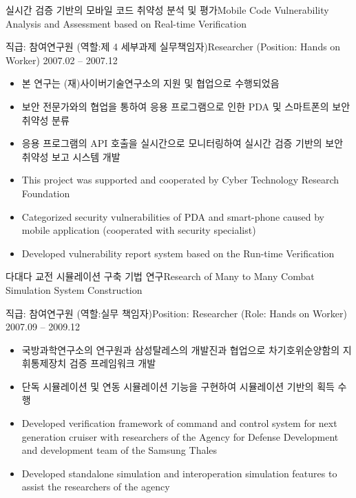 \documentclass[english,full]{resume_structure}
\begin{document}
\begin{Project}
  
{실시간 검증 기반의 모바일 코드 취약성 분석 및 평가}{Mobile Code Vulnerability Analysis and Assessment based on Real-time Verification}
{}{} 
{
\ResumeSubSection %
    {직급: 참여연구원 (역할:제 4 세부과제 실무책임자)}{Researcher (Position: Hands on Worker)}
    {2007.02 -- 2007.12}
    {
      \begin{itemize}
        \item 본 연구는 (재)사이버기술연구소의 지원 및 협업으로 수행되었음
        \item 보안 전문가와의 협업을 통하여 응용 프로그램으로 인한 PDA 및 스마트폰의 보안 취약성 분류
        \item 응용 프로그램의 API 호출을 실시간으로 모니터링하여 실시간 검증 기반의 보안 취약성 보고 시스템 개발
      \end{itemize}
    }
    {
      \begin{itemize}
        \item This project was supported and cooperated by Cyber Technology Research Foundation
        \item Categorized security vulnerabilities of PDA and smart-phone caused by mobile application (cooperated with security specialist)
        \item Developed vulnerability report system based on the Run-time Verification 
      \end{itemize}
    }
}

{다대다 교전 시뮬레이션 구축 기법 연구}{Research of Many to Many Combat Simulation System Construction}
{}{} 
{
\ResumeSubSection %
    {직급: 참여연구원 (역할:실무 책임자)}{Position: Researcher (Role: Hands on Worker)}
    {2007.09 -- 2009.12}
    {
      \begin{itemize}
        \item 국방과학연구소의 연구원과 삼성탈레스의 개발진과 협업으로 차기호위순양함의 지휘통제장치 검증 프레임워크 개발
        \item 단독 시뮬레이션 및 연동 시뮬레이션 기능을 구현하여 시뮬레이션 기반의 획득 수행
      \end{itemize}
    }
    {
      \begin{itemize}
        \item Developed verification framework of command and control system for next generation cruiser with researchers of the Agency for Defense Development and development team of the Samsung Thales
        \item Developed standalone simulation and interoperation simulation features to assist the researchers of the agency
      \end{itemize}
    }
}


\end{Project}
\end{document}
